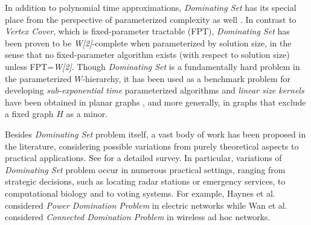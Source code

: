\documentclass[a4paper,11pt]{article}
\theoremstyle{definition}
\begin{document}
\smallskip

In addition to polynomial time approximations, {\em Dominating
Set} has its special place from the perspective of parameterized complexity as well \cite{RGDMRF99,JFMG06,RN06}. In
contrast to {\em Vertex Cover}, which is fixed-parameter tractable (FPT),
{\em Dominating Set} has been proven to be {\it W[2]}-complete when
parameterized by solution size, in the sense that no fixed-parameter
algorithm exists (with respect to solution size) unless FPT={\it W[2]}. Though {\em Dominating Set} is a fundamentally hard problem in the parameterized $W$-hierarchy, it has been used as a benchmark problem for developing {\it sub-exponential time} parameterized algorithms \cite{JAHLBHFTKRN02,1101823,1139978} and 
{\it linear size kernels} have been obtained in planar graphs \cite{990309,JFMG06,DBLP:conf/icalp/GuoN07,RN06}, and more generally, in graphs that exclude a fixed graph $H$ as a minor.

\smallskip

Besides {\em Dominating Set} problem itself, a vast body of
work has been proposed in the literature, considering possible variations from purely theoretical aspects to practical applications. See \cite{TWHSHPS98,FSR78} for a detailed survey. In particular, variations of {\em Dominating Set} problem occur in numerous practical settings, ranging from strategic decisions, such as locating radar stations or emergency services, to computational biology and to voting systems. For example, Haynes et al. \cite{587927} considered {\em Power Domination Problem} in electric networks \cite{587927,DBLP:conf/cocoon/LiaoL05} while Wan et al. \cite{PJWKMAOF03} considered {\em Connected Domination Problem} in wireless ad hoc networks.

\smallskip
\end{document}
